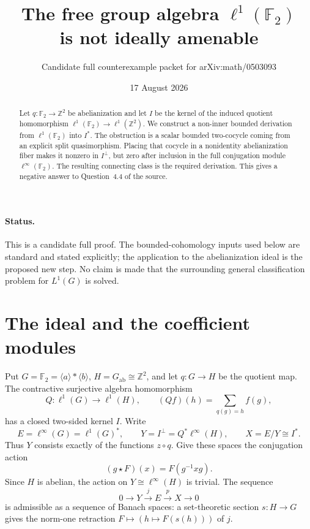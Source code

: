 \documentclass[11pt]{article}
\title{The free group algebra \(\ell^1(\mathbb F_2)\)\\
is not ideally amenable}
\author{Candidate full counterexample packet for arXiv:math/0503093}
\date{17 August 2026}
\newcommand{\F}{\mathbb F_2}
\newcommand{\Z}{\mathbb Z}
\begin{document}
\maketitle

\begin{abstract}
Let \(q:\mathbb F_2\to\mathbb Z^2\) be abelianization and let \(I\) be the
kernel of the induced quotient homomorphism
\(\ell^1(\mathbb F_2)\to\ell^1(\mathbb Z^2)\).  We construct a non-inner
bounded derivation from \(\ell^1(\mathbb F_2)\) into \(I^*\).  The obstruction
is a scalar bounded two-cocycle coming from an explicit split quasimorphism.
Placing that cocycle in a nonidentity abelianization fiber makes it nonzero in
\(I^\perp\), but zero after inclusion in the full conjugation module
\(\ell^\infty(\mathbb F_2)\).  The resulting connecting class is the required
derivation.  This gives a negative answer to Question~4.4 of the source.
\end{abstract}

\paragraph{Status.}
This is a candidate full proof.  The bounded-cohomology inputs used below are
standard and stated explicitly; the application to the abelianization ideal is
the proposed new step.  No claim is made that the surrounding general
classification problem for \(L^1(G)\) is solved.

\section{The ideal and the coefficient modules}

Put \(G=\F=\langle a\rangle*\langle b\rangle\), \(H=G_{\mathrm{ab}}\cong
\Z^2\), and let \(q:G\to H\) be the quotient map.  The contractive surjective
algebra homomorphism
\[
 Q:\ell^1(G)\longrightarrow\ell^1(H),\qquad
 (Qf)(h)=\sum_{q(g)=h}f(g),
\]
has a closed two-sided kernel \(I\).  Write
\[
 E=\ell^\infty(G)=\ell^1(G)^*,\qquad
 Y=I^\perp=Q^*\ell^\infty(H),\qquad
 X=E/Y\cong I^*.
\]
Thus \(Y\) consists exactly of the functions \(z\circ q\).  Give these spaces
the conjugation action
\begin{equation}\label{eq:conj}
 (g\star F)(x)=F(g^{-1}xg).
\end{equation}
Since \(H\) is abelian, the action on \(Y\cong\ell^\infty(H)\) is trivial.
The sequence
\begin{equation}\label{eq:ses}
 0\longrightarrow Y\xrightarrow{j}E\xrightarrow{p}X\longrightarrow0
\end{equation}
is admissible as a sequence of Banach spaces: a set-theoretic section
\(s:H\to G\) gives the norm-one retraction
\(F\mapsto(h\mapsto F(s(h)))\) of \(j\).
\end{document}
